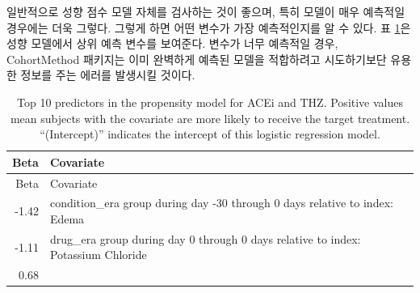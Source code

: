 \documentclass[10.5pt]{book}
\theoremstyle{definition}
\theoremstyle{definition}
\theoremstyle{definition}
\theoremstyle{remark}
\begin{document}
일반적으로 성향 점수 모델 자체를 검사하는 것이 좋으며, 특히 모델이 매우
예측적일 경우에는 더욱 그렇다. 그렇게 하면 어떤 변수가 가장 예측적인지를
알 수 있다. 표 \ref{tab:psModel}은 성향 모델에서 상위 예측 변수를
보여준다. 변수가 너무 예측적일 경우, CohortMethod 패키지는 이미 완벽하게
예측된 모델을 적합하려고 시도하기보단 유용한 정보를 주는 에러를 발생시킬
것이다. 

\begin{longtable}[]{@{}rl@{}}
\caption{\label{tab:psModel} Top 10 predictors in the propensity model for
ACEi and THZ. Positive values mean subjects with the covariate are more
likely to receive the target treatment. ``(Intercept)'' indicates the
intercept of this logistic regression model.}\tabularnewline
\toprule
\begin{minipage}[b]{0.07\columnwidth}\raggedleft\strut
Beta\strut
\end{minipage} & \begin{minipage}[b]{0.87\columnwidth}\raggedright\strut
Covariate\strut
\end{minipage}\tabularnewline
\midrule
\endfirsthead
\toprule
\begin{minipage}[b]{0.07\columnwidth}\raggedleft\strut
Beta\strut
\end{minipage} & \begin{minipage}[b]{0.87\columnwidth}\raggedright\strut
Covariate\strut
\end{minipage}\tabularnewline
\midrule
\endhead
\begin{minipage}[t]{0.07\columnwidth}\raggedleft\strut
-1.42\strut
\end{minipage} & \begin{minipage}[t]{0.87\columnwidth}\raggedright\strut
condition\_era group during day -30 through 0 days relative to index:
Edema\strut
\end{minipage}\tabularnewline
\begin{minipage}[t]{0.07\columnwidth}\raggedleft\strut
-1.11\strut
\end{minipage} & \begin{minipage}[t]{0.87\columnwidth}\raggedright\strut
drug\_era group during day 0 through 0 days relative to index: Potassium
Chloride\strut
\end{minipage}\tabularnewline
\begin{minipage}[t]{0.07\columnwidth}\raggedleft\strut
0.68\strut
\end{minipage} & \begin{minipage}[t]{0.87\columnwidth}\raggedright\strut

\end{minipage}
\end{longtable}
\end{document}
